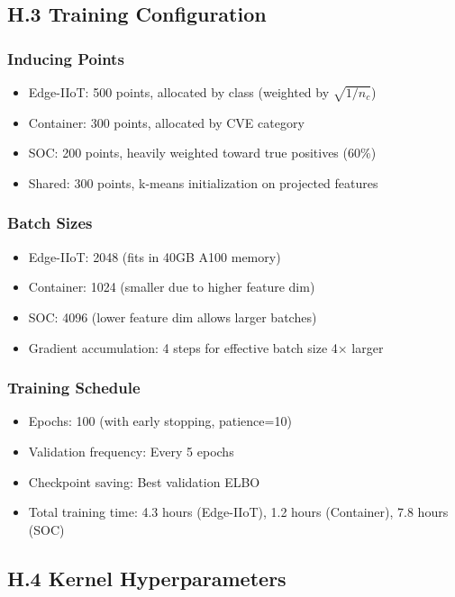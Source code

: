 \documentclass[12pt]{article}
\begin{document}
\subsection{H.3 Training Configuration}

\subsubsection{Inducing Points}
\begin{itemize}
\item Edge-IIoT: 500 points, allocated by class (weighted by $\sqrt{1/n_c}$)
\item Container: 300 points, allocated by CVE category
\item SOC: 200 points, heavily weighted toward true positives (60\%)
\item Shared: 300 points, k-means initialization on projected features
\end{itemize}

\subsubsection{Batch Sizes}
\begin{itemize}
\item Edge-IIoT: 2048 (fits in 40GB A100 memory)
\item Container: 1024 (smaller due to higher feature dim)
\item SOC: 4096 (lower feature dim allows larger batches)
\item Gradient accumulation: 4 steps for effective batch size 4× larger
\end{itemize}

\subsubsection{Training Schedule}
\begin{itemize}
\item Epochs: 100 (with early stopping, patience=10)
\item Validation frequency: Every 5 epochs
\item Checkpoint saving: Best validation ELBO
\item Total training time: 4.3 hours (Edge-IIoT), 1.2 hours (Container), 7.8 hours (SOC)
\end{itemize}

\subsection{H.4 Kernel Hyperparameters}
\end{document}

